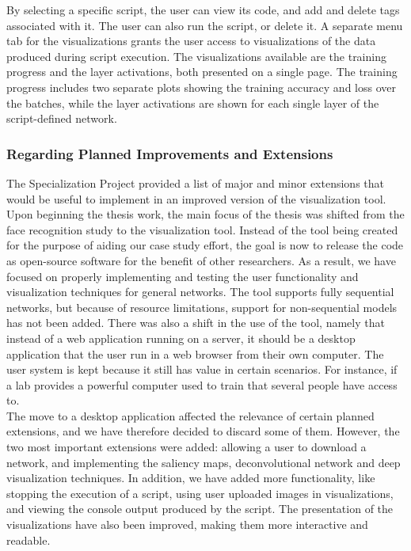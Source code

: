 \noindent By selecting a specific script, the user can view its code, and add and delete tags associated with it. The user can also run the script, or delete it. A separate menu tab for the visualizations grants the user access to visualizations of the data produced during script execution. The visualizations available are the training progress and the layer activations, both presented on a single page. The training progress includes two separate plots showing the training accuracy and loss over the batches, while the layer activations are shown for each single layer of the script-defined network.

\subsubsection{Regarding Planned Improvements and Extensions}

The Specialization Project provided a list of major and minor extensions that would be useful to implement in an improved version of the visualization tool. Upon beginning the thesis work, the main focus of the thesis was shifted from the face recognition study to the visualization tool. Instead of the tool being created for the purpose of aiding our case study effort, the goal is now to release the code as open-source software for the benefit of other researchers. As a result, we have focused on properly implementing and testing the user functionality and visualization techniques for general networks. The tool supports fully sequential networks, but because of resource limitations, support for non-sequential models has not been added. There was also a shift in the use of the tool, namely that instead of a web application running on a server, it should be a desktop application that the user run in a web browser from their own computer. The user system is kept because it still has value in certain scenarios. For instance, if a lab provides a powerful computer used to train  that several people have access to. \\

\noindent The move to a desktop application affected the relevance of certain planned extensions, and we have therefore decided to discard some of them. However, the two most important extensions were added: allowing a user to download a network, and implementing the saliency maps, deconvolutional network and deep visualization techniques. In addition, we have added more functionality, like stopping the execution of a script, using user uploaded images in visualizations, and viewing the console output produced by the script. The presentation of the visualizations have also been improved, making them more interactive and readable.

